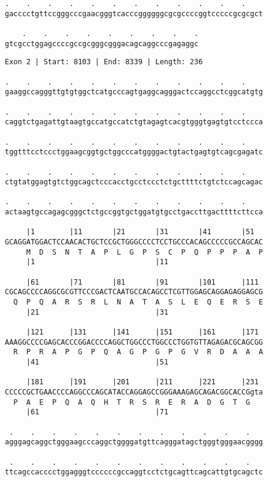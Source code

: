 \documentclass{article}
\begin{document}
\newpage
\begin{Verbatim}[fontfamily=courier]
    .    .    .    .    .    .    .    .    .    .    .    .
gacccctgttccgggcccgaacgggtcacccggggggcgcgccccggtcccccgcgcgct

    .    .    .    .    .    .    .    .    .
gtcgcctggagccccgccgcgggcgggacagcaggcccgagaggc
\end{Verbatim}
\newpage
\begin{Verbatim}[fontfamily=courier]
Exon 2 | Start: 8103 | End: 8339 | Length: 236

.    .    .    .    .    .    .    .    .    .    .    .    
gaaggccagggttgtgtggctcatgcccagtgaggcagggactccaggcctcggcatgtg

.    .    .    .    .    .    .    .    .    .    .    .    
caggtctgagattgtaagtgccatgccatctgtagagtcacgtgggtgagtgtcctccca

.    .    .    .    .    .    .    .    .    .    .    .    
tggtttcctccctggaagcggtgctggcccatggggactgtactgagtgtcagcgagatc

.    .    .    .    .    .    .    .    .    .    .    .    
ctgtatggagtgtctggcagctcccacctgcctccctctgcttttctgtctccagcagac

.    .    .    .    .    .    .    .    .    .    .    .    
actaagtgccagagcgggctctgccggtgctggatgtgcctgaccttgacttttcttcca

     |1        |11       |21       |31       |41       |51  
GCAGGATGGACTCCAACACTGCTCCGCTGGGCCCCTCCTGCCCACAGCCCCCGCCAGCAC
     M  D  S  N  T  A  P  L  G  P  S  C  P  Q  P  P  P  A  P
     |1                            |11                      

     |61       |71       |81       |91       |101      |111 
CGCAGCCCCAGGCGCGTTCCCGACTCAATGCCACAGCCTCGTTGGAGCAGGAGAGGAGCG
  Q  P  Q  A  R  S  R  L  N  A  T  A  S  L  E  Q  E  R  S  E
     |21                           |31                      

     |121      |131      |141      |151      |161      |171 
AAAGGCCCCGAGCACCCGGACCCCAGGCTGGCCCTGGCCCTGGTGTTAGAGACGCAGCGG
  R  P  R  A  P  G  P  Q  A  G  P  G  P  G  V  R  D  A  A  A
     |41                           |51                      

     |181      |191      |201      |211      |221      |231 
CCCCCGCTGAACCCCAGGCCCAGCATACCAGGAGCCGGGAAAGAGCAGACGGCACCGgta
  P  A  E  P  Q  A  Q  H  T  R  S  R  E  R  A  D  G  T  G   
     |61                           |71                      

 .    .    .    .    .    .    .    .    .    .    .    .   
agggagcaggctgggaagcccaggctggggatgttcagggatagctgggtgggaacgggg

 .    .    .    .    .    .    .    .    .    .    .    .   
ttcagccacccctggagggtccccccgccaggtcctctgcagttcagcattgtgcagctc

\end{Verbatim}
\end{document}
